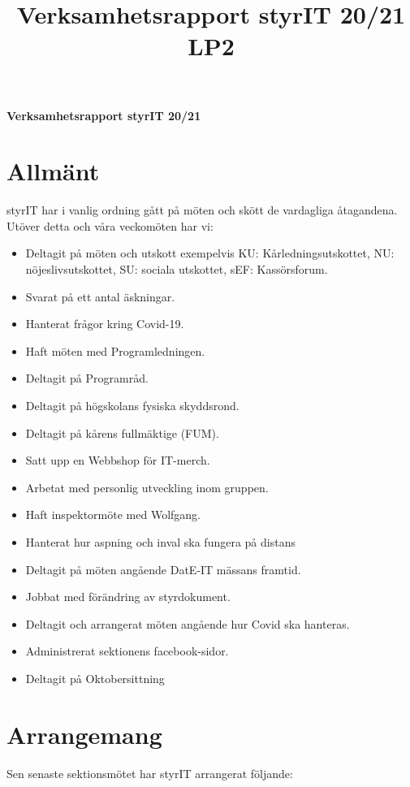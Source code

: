 \documentclass[11pt, noincludeaddress, nopagination]{classes/cthit}
\newcommand{\kommitte}{styrIT 20/21}
\newcommand{\lp}{LP2}
\begin{document}
\title{Verksamhetsrapport \kommitte{} \lp}
\authors{\kommitte}
\makeheadfoot%
\begin{center}
    \Huge{\textbf{Verksamhetsrapport \kommitte{} }}
\end{center}

\section*{Allmänt}

styrIT har i vanlig ordning gått på möten och skött de vardagliga åtagandena. Utöver
detta och våra veckomöten har vi:
\begin{itemize}
    \item Deltagit på möten och utskott exempelvis KU: Kårledningsutskottet, NU: nöjeslivsutskottet, SU: sociala utskottet, sEF: Kassörsforum.
    \item Svarat på ett antal äskningar.
    \item Hanterat frågor kring Covid-19.
    \item Haft möten med Programledningen.
    \item Deltagit på Programråd.
    \item Deltagit på högskolans fysiska skyddsrond.
    \item Deltagit på kårens fullmäktige (FUM).
    \item Satt upp en Webbshop för IT-merch.
    \item Arbetat med personlig utveckling inom gruppen.
    \item Haft inspektormöte med Wolfgang.
    \item Hanterat hur aspning och inval ska fungera på distans
    \item Deltagit på möten angående DatE-IT mässans framtid.
    \item Jobbat med förändring av styrdokument.
    \item Deltagit och arrangerat möten angående hur Covid ska hanteras.
    \item Administrerat sektionens facebook-sidor.
    \item Deltagit på Oktobersittning
    
\end{itemize}

\section*{Arrangemang}
Sen senaste sektionsmötet har styrIT arrangerat följande: 
\end{document}
